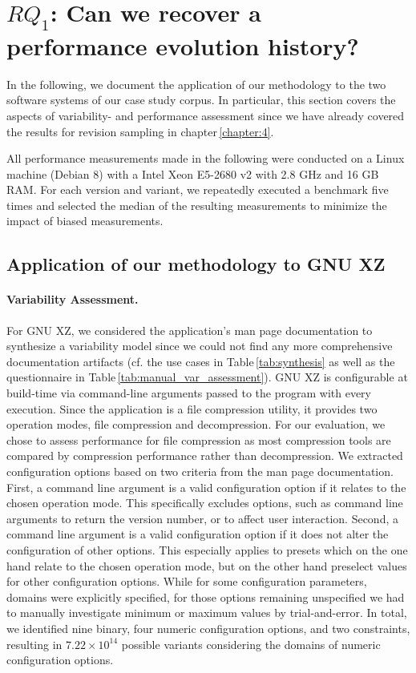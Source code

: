 \section{$RQ_1$: Can we recover a performance evolution history?}\label{sec:expsetup} 
In the following, we document the application of our methodology to the two
software systems of our case study corpus. In particular, this section covers
the aspects of variability- and performance assessment since we have already
covered the results for revision sampling in chapter\,\ref{chapter:4}. 

All performance measurements made in the
following were conducted on a Linux machine (Debian 8) with a Intel Xeon
E5-2680 v2 with 2.8 GHz and 16 GB RAM. For each version and variant, we
repeatedly executed  a benchmark five times and selected the median of the
resulting measurements to minimize the impact of biased measurements.

\subsection{Application of our methodology to GNU XZ}
\paragraph{Variability Assessment.} For GNU XZ, we considered the application’s
man page documentation to synthesize a variability model since we could not
find any more comprehensive documentation artifacts (cf. the use cases in
Table\,\ref{tab:synthesis} as well as the questionnaire in
Table\,\ref{tab:manual_var_assessment}).
GNU XZ is configurable at build-time via command-line arguments passed to the program with every execution. Since the application is a file compression utility, it provides two operation modes,
file compression and decompression. For our evaluation, we chose to assess
performance for file compression as most compression tools are compared by
compression performance rather than decompression. We extracted configuration
options based on two criteria from the man page documentation. First, a command
line argument is a valid configuration option if it relates to the chosen
operation mode. This specifically excludes options, such as command line
arguments to return the version number, or to affect user interaction. Second,
a command line argument is a valid configuration option if it does not alter
the configuration of other options. This especially applies to presets which on
the one hand relate to the chosen operation mode, but on the other hand
preselect values for other configuration options. While for some configuration
parameters, domains were explicitly specified, for those options remaining
unspecified we had to manually investigate minimum or maximum values by
trial-and-error. In total, we identified nine binary, four numeric
configuration options, and two constraints, resulting in $7.22 \times 10^{14}$
possible variants considering the domains of numeric configuration options.

